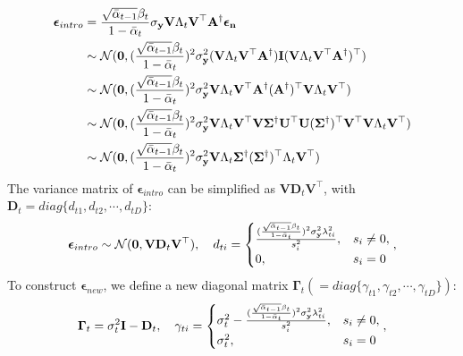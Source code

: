 \documentclass{article} \usepackage{iclr2023_conference,times}
\begin{document}
\begin{align}
    \boldsymbol{\epsilon}_{intro} &= \frac{\sqrt{\Bar{\alpha}_{t-1}}\beta_{t}}{1-\Bar{\alpha}_{t}}\sigma_{\mathbf{y}}\mathbf{V}\Lambda_{t}\mathbf{V}^{\top}\mathbf{A}^{\dagger}\boldsymbol{\epsilon}_{\mathbf{n}}\\
    &\sim\mathcal{N}(\mathbf{0}, (\frac{\sqrt{\Bar{\alpha}_{t-1}}\beta_{t}}{1-\Bar{\alpha}_{t}})^2\sigma_{\mathbf{y}}^2(\mathbf{V}\Lambda_{t}\mathbf{V}^{\top}\mathbf{A}^{\dagger})\mathbf{I}(\mathbf{V}\Lambda_{t}\mathbf{V}^{\top}\mathbf{A}^{\dagger})^{\top})\\
    &\sim\mathcal{N}(\mathbf{0}, (\frac{\sqrt{\Bar{\alpha}_{t-1}}\beta_{t}}{1-\Bar{\alpha}_{t}})^2\sigma_{\mathbf{y}}^2\mathbf{V}\Lambda_{t}\mathbf{V}^{\top}\mathbf{A}^{\dagger}(\mathbf{A}^{\dagger})^{\top}\mathbf{V}\Lambda_{t}\mathbf{V}^{\top})\\
    &\sim\mathcal{N}(\mathbf{0}, (\frac{\sqrt{\Bar{\alpha}_{t-1}}\beta_{t}}{1-\Bar{\alpha}_{t}})^2\sigma_{\mathbf{y}}^2\mathbf{V}\Lambda_{t}\mathbf{V}^{\top}\mathbf{V}\mathbf{\Sigma}^{\dagger}\mathbf{U}^{\top}\mathbf{U}(\mathbf{\Sigma}^{\dagger})^{\top}\mathbf{V}^{\top}\mathbf{V}\Lambda_{t}\mathbf{V}^{\top})\\
    &\sim\mathcal{N}(\mathbf{0}, (\frac{\sqrt{\Bar{\alpha}_{t-1}}\beta_{t}}{1-\Bar{\alpha}_{t}})^2\sigma_{\mathbf{y}}^2\mathbf{V}\Lambda_{t}\mathbf{\Sigma}^{\dagger}(\mathbf{\Sigma}^{\dagger})^{\top}\Lambda_{t}\mathbf{V}^{\top})
\end{align}
The variance matrix of $\boldsymbol{\epsilon}_{intro}$ can be simplified as $\mathbf{V}\mathbf{D}_t\mathbf{V}^{\top}$, with $\mathbf{D}_t=diag\{d_{t1}, d_{t2}, \cdots, d_{tD}\}$: 
\begin{align}
    \boldsymbol{\epsilon}_{intro}\sim\mathcal{N}(\mathbf{0}, \mathbf{V}\mathbf{D}_t\mathbf{V}^{\top}),\quad
    d_{ti}=\begin{cases}
        \frac{({\frac{\sqrt{\Bar{\alpha}_{t-1}}\beta_{t}}{1-\Bar{\alpha}_{t}}})^2\sigma_{\mathbf{y}}^2\lambda_{ti}^2}{s_i^2}, & s_i \neq 0 , \\
        0, & s_i = 0
    \end{cases},
\end{align}
To construct $\boldsymbol{\epsilon}_{new}$, we define a new diagonal matrix $\mathbf{\Gamma}_t(=diag\{\gamma_{t1}, \gamma_{t2}, \cdots, \gamma_{tD}\})$:
\begin{align}    \mathbf{\Gamma}_t=\sigma_{t}^2\mathbf{I}-\mathbf{D}_t,\quad
    \gamma_{ti}=\begin{cases}
        \sigma_t^2 - \frac{({\frac{\sqrt{\Bar{\alpha}_{t-1}}\beta_{t}}{1-\Bar{\alpha}_{t}}})^2\sigma_{\mathbf{y}}^2\lambda_{ti}^2}{s_i^2}, & s_i \neq 0 , \\
        \sigma_t^2, & s_i = 0
    \end{cases},
    \label{eq:gamma_ddpm}
\end{align}
\end{document}
